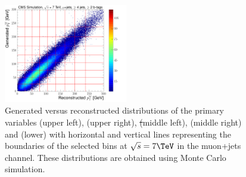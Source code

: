 \begin{figure}[hbtp]
	 \includegraphics[width=0.48\textwidth]{Chapters/04_Analysis/04b_XSections/images/binning/muon_WPT_7TeV.pdf}\hfill
	 \caption{Generated versus reconstructed distributions of the primary variables \met (upper left), \HT (upper
	 right), \st (middle left), \mt (middle right) and \wpt (lower) with horizontal and vertical lines
	 representing the boundaries of the selected bins at $\sqrt{s}=7\TeV$ in the muon+jets channel. These
	 distributions are obtained using \ttbar Monte Carlo simulation.}
     \label{fig:binning_7TeV_muon}
 \end{figure}

